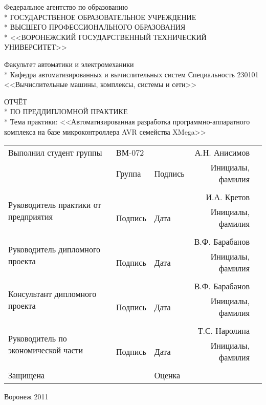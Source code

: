 \begin{center}
Федеральное агентство по образованию \\*
ГОСУДАРСТВЕНОЕ ОБРАЗОВАТЕЛЬНОЕ УЧРЕЖДЕНИЕ \\*
ВЫСШЕГО ПРОФЕССИОНАЛЬНОГО ОБРАЗОВАНИЯ \\*
<<ВОРОНЕЖСКИЙ ГОСУДАРСТВЕННЫЙ ТЕХНИЧЕСКИЙ УНИВЕРСИТЕТ>> \\
\end{center}
\begin{center}
Факультет  автоматики и электромеханики \\*
Кафедра автоматизированных и вычислительных систем
Специальность 230101 <<Вычислительные машины, комплексы, системы и сети>>
\end{center}

\vspace{0.2em}

\begin{center}
ОТЧЁТ \\*
ПО ПРЕДДИПЛОМНОЙ ПРАКТИКЕ \\*
Тема практики: <<Автоматизированная разработка программно-аппаратного комплекса
на базе микроконтроллера AVR семейства XMega>>
\end{center}

\vspace{1em}

\begin{tabular}{p{12em}p{5em}@{}p{5em}@{}r@{}r}
Выполнил студент группы & \hrulefill{} ВМ-072 & \hrulefill{}  & \hrulefill{} А.Н. Анисимов \\
 &  \small{Группа}  & \small{Подпись} &\small{Инициалы, фамилия} \\
& & & \\
\multirow{2}{12em}{Руководитель практики\newline{} от предприятия} & \hrulefill{} & \hrulefill{} & \hrulefill{} И.А. Кретов \\
 & \small{Подпись}  & \small{Дата} & \small{Инициалы, фамилия} \\
 & & & \\
\multirow{2}{12em}{Руководитель дипломного  проекта} & \hrulefill{} & \hrulefill{} & \hrulefill{} В.Ф. Барабанов \\
 & \small{Подпись}  & \small{Дата} & \small{Инициалы, фамилия} \\
& & & \\
\multirow{2}{12em}{Консультант дипломного проекта} & \hrulefill{} & \hrulefill{} & \hrulefill{} В.Ф. Барабанов \\
 & \small{Подпись}  & \small{Дата} & \small{Инициалы, фамилия} \\
& & & \\
\multirow{2}{12em}{Руководитель по экономической части} & \hrulefill{} & \hrulefill{} & \hrulefill{} Т.С. Наролина \\
 & \small{Подпись}  & \small{Дата} & \small{Инициалы, фамилия} \\
& & & \\
Защищена \hrulefill{} &  & Оценка \hrulefill{} & \hrulefill{} 
\end{tabular}

\vspace{1.5em}

\begin{center}Воронеж 2011\end{center}
